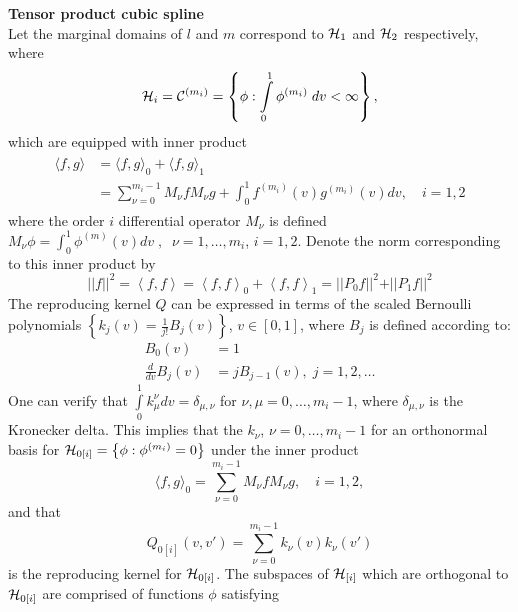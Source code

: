 \begin{example}{\textbf {Tensor product cubic spline}}\\
\vspace{0.5cm}
Let the marginal domains of $l$ and $m$ correspond to $\mathcal{H}_1$ and $\mathcal{H}_2$ respectively, where
\[
\mathcal{H}_i = \mathcal{C}^{\left(m_i\right)} = \left\{ \phi: \int \limits_{0}^1 \phi^{\left(m_i\right)}\;dv < \infty  \right\},
\]
\noindent
which are equipped with inner product
\begin{align}
\begin{split}
\langle f,g\rangle &= \langle f,g\rangle_0 + \langle f,g\rangle_1\\
 &= \sum_{\nu=0}^{m_i-1}M_{\nu} f M_{\nu} g + \int_0^1 f^{\left( m_i \right)}\left(v\right)g^{\left( m_i \right)}\left(v\right)dv, \quad i = 1,2
\end{split}
\end{align}
\noindent
where the order $i$ differential operator $M_\nu$ is defined $M_\nu \phi = \int_0^1 \phi^{\left( m \right)}\left(v\right) dv\;,\;\; \nu = 1, \dots, m_i$, $i = 1,2$. Denote the norm corresponding to this inner product by
\[
\vert \vert f \vert \vert^2 = \left< f,f\right> = \left< f,f\right>_0 + \left< f,f\right>_1 = \vert \vert P_0 f \vert \vert^2 + \vert \vert P_1 f \vert \vert^2
\]
\noindent
The reproducing kernel $Q$ can be expressed in terms of the scaled Bernoulli polynomials $\left\{ k_j\left(v\right) = \frac{1}{j!}B_j\left(v\right) \right\}$, $v \in \left[0,1\right]$, where $B_j$ is defined according to:
\begin{align*}
B_0\left(v\right) &= 1\\
\frac{d}{dv} B_j\left(v\right) &= jB_{j-1}\left(v\right), \;j = 1, 2, \dots
\end{align*}
\noindent
One can verify that $\int \limits_0^1 k_\mu^\nu dv = \delta_{\mu,\nu}$ for $\nu, \mu= 0,\dots, m_i -1$, where $\delta_{\mu,\nu}$ is the Kronecker delta. This implies that the $k_\nu$, $\nu = 0,\dots, m_i-1$ for an orthonormal basis for $\mathcal{H}_{0\left[i\right]} = \left\{ \phi: \phi^{\left( m_i \right)} = 0 \right\}$ under the inner product
\[
\langle f,g\rangle_0 =  \sum_{\nu=0}^{m_i-1}M_{\nu} f M_{\nu} g, \quad i = 1, 2, 
\]
\noindent
and that 
\[
Q_{0\left[i\right]}\left(v,v'\right) = \sum_{\nu=0}^{m_i-1}  k_\nu\left(v\right)  k_\nu\left(v'\right) 
\]
\noindent
is the reproducing kernel for $\mathcal{H}_{0\left[i\right]}$. The subspaces of $\mathcal{H}_{\left[i\right]}$ which are orthogonal to $\mathcal{H}_{0\left[i\right]}$ are comprised of functions $\phi$ satisfying 

\end{example}
